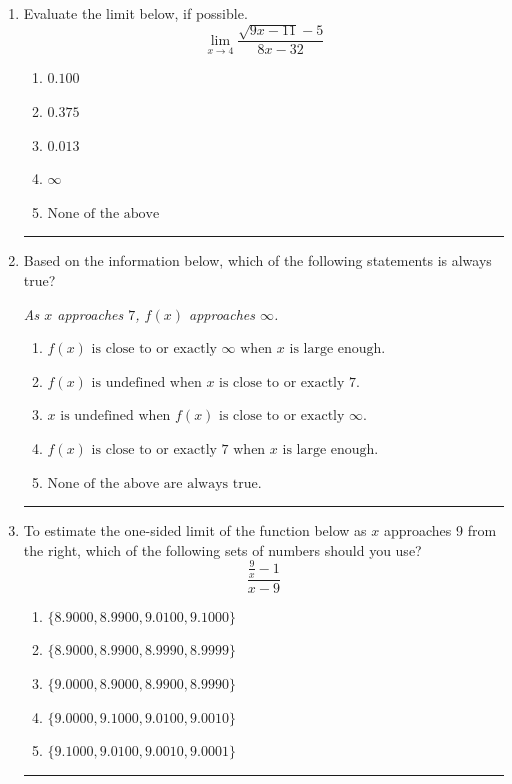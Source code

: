 \documentclass[14pt]{extbook}
\newcommand{\litem}[1]{\item#1\hspace*{-1cm}\rule{\textwidth}{0.4pt}}
\begin{document}
\begin{enumerate}
{\begin{enumerate}[label=\Alph*.]
\end{enumerate} }
\litem{
Evaluate the limit below, if possible.\[ \lim_{x \rightarrow 4} \frac{\sqrt{9x - 11} - 5}{8x - 32} \]\begin{enumerate}[label=\Alph*.]
\item \( 0.100 \)
\item \( 0.375 \)
\item \( 0.013 \)
\item \( \infty \)
\item \( \text{None of the above} \)

\end{enumerate} }
\litem{
Based on the information below, which of the following statements is always true?
\begin{center}
    \textit{ As $x$ approaches $7$, $f(x)$ approaches $\infty$. }
\end{center}
\begin{enumerate}[label=\Alph*.]
\item \( f(x) \text{ is close to or exactly } \infty \text{ when } x \text{ is large enough}. \)
\item \( f(x) \text{ is undefined when } x \text{ is close to or exactly } 7. \)
\item \( x \text{ is undefined when } f(x) \text{ is close to or exactly } \infty. \)
\item \( f(x) \text{ is close to or exactly } 7 \text{ when } x \text{ is large enough}. \)
\item \( \text{None of the above are always true.} \)

\end{enumerate} }
\litem{
To estimate the one-sided limit of the function below as $x$ approaches 9 from the right, which of the following sets of numbers should you use?\[ \frac{\frac{9}{x} - 1}{x - 9} \]\begin{enumerate}[label=\Alph*.]
\item \( \{ 8.9000, 8.9900, 9.0100, 9.1000 \} \)
\item \( \{ 8.9000, 8.9900, 8.9990, 8.9999 \} \)
\item \( \{ 9.0000, 8.9000, 8.9900, 8.9990 \} \)
\item \( \{ 9.0000, 9.1000, 9.0100, 9.0010 \} \)
\item \( \{ 9.1000, 9.0100, 9.0010, 9.0001 \} \)


\end{enumerate}}
\end{enumerate}
\end{document}
